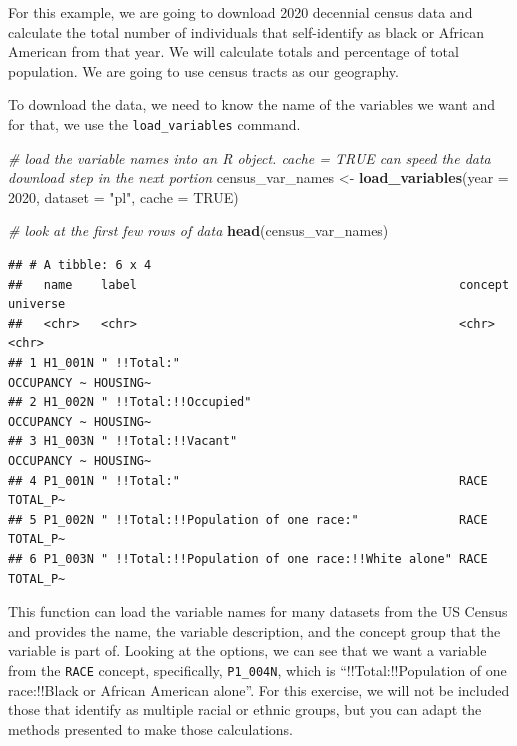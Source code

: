 \documentclass[
]{book}
\newenvironment{Shaded}{\begin{snugshade}}{\end{snugshade}}
\newcommand{\AttributeTok}[1]{\textcolor[rgb]{0.13,0.29,0.53}{#1}}
\newcommand{\CommentTok}[1]{\textcolor[rgb]{0.56,0.35,0.01}{\textit{#1}}}
\newcommand{\ConstantTok}[1]{\textcolor[rgb]{0.56,0.35,0.01}{#1}}
\newcommand{\DecValTok}[1]{\textcolor[rgb]{0.00,0.00,0.81}{#1}}
\newcommand{\FunctionTok}[1]{\textcolor[rgb]{0.13,0.29,0.53}{\textbf{#1}}}
\newcommand{\NormalTok}[1]{#1}
\newcommand{\OtherTok}[1]{\textcolor[rgb]{0.56,0.35,0.01}{#1}}
\newcommand{\StringTok}[1]{\textcolor[rgb]{0.31,0.60,0.02}{#1}}
\begin{document}
For this example, we are going to download 2020 decennial census data and calculate the total number of individuals that self-identify as black or African American from that year. We will calculate totals and percentage of total population. We are going to use census tracts as our geography.

To download the data, we need to know the name of the variables we want and for that, we use the \texttt{load\_variables} command.

\begin{Shaded}
\begin{Highlighting}[]
\CommentTok{\# load the variable names into an R object. cache = TRUE can speed the data download step in the next portion}
\NormalTok{census\_var\_names }\OtherTok{\textless{}{-}} \FunctionTok{load\_variables}\NormalTok{(}\AttributeTok{year =} \DecValTok{2020}\NormalTok{, }\AttributeTok{dataset =} \StringTok{"pl"}\NormalTok{, }\AttributeTok{cache =} \ConstantTok{TRUE}\NormalTok{)}
\end{Highlighting}
\end{Shaded}

\begin{Shaded}
\begin{Highlighting}[]
\CommentTok{\# look at the first few rows of data}
\FunctionTok{head}\NormalTok{(census\_var\_names)}
\end{Highlighting}
\end{Shaded}

\begin{verbatim}
## # A tibble: 6 x 4
##   name    label                                             concept     universe
##   <chr>   <chr>                                             <chr>       <chr>   
## 1 H1_001N " !!Total:"                                       OCCUPANCY ~ HOUSING~
## 2 H1_002N " !!Total:!!Occupied"                             OCCUPANCY ~ HOUSING~
## 3 H1_003N " !!Total:!!Vacant"                               OCCUPANCY ~ HOUSING~
## 4 P1_001N " !!Total:"                                       RACE        TOTAL_P~
## 5 P1_002N " !!Total:!!Population of one race:"              RACE        TOTAL_P~
## 6 P1_003N " !!Total:!!Population of one race:!!White alone" RACE        TOTAL_P~
\end{verbatim}

This function can load the variable names for many datasets from the US Census and provides the name, the variable description, and the concept group that the variable is part of. Looking at the options, we can see that we want a variable from the \texttt{RACE} concept, specifically, \texttt{P1\_004N}, which is ``!!Total:!!Population of one race:!!Black or African American alone''. For this exercise, we will not be included those that identify as multiple racial or ethnic groups, but you can adapt the methods presented to make those calculations.
\end{document}
